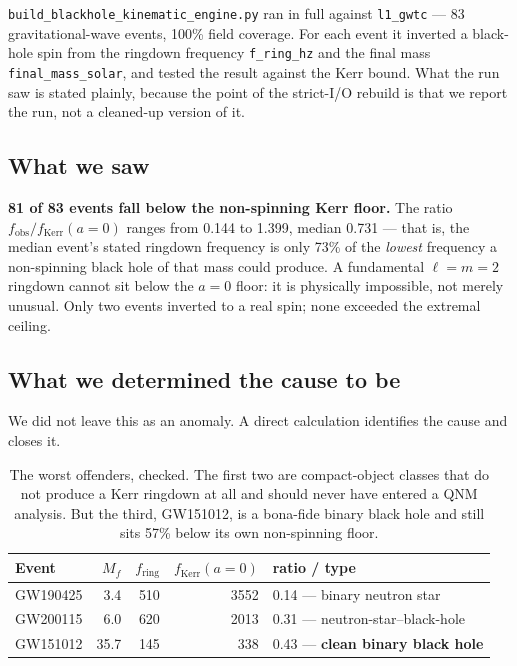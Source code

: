 \documentclass[11pt, letterpaper, openany]{book}
\begin{document}
\texttt{build\_blackhole\_kinematic\_engine.py} ran in full against \texttt{l1\_gwtc} --- 83
gravitational-wave events, 100\% field coverage. For each event it inverted a black-hole spin from
the ringdown frequency \texttt{f\_ring\_hz} and the final mass \texttt{final\_mass\_solar}, and
tested the result against the Kerr bound. What the run saw is stated plainly, because the point of
the strict-I/O rebuild is that we report the run, not a cleaned-up version of it.

\subsection{What we saw}

\begin{erratumbox}
\textbf{81 of 83 events fall below the non-spinning Kerr floor.} The ratio
$f_{\text{obs}}/f_{\text{Kerr}}(a{=}0)$ ranges from 0.144 to 1.399, median 0.731 --- that is, the
median event's stated ringdown frequency is only 73\% of the \emph{lowest} frequency a
non-spinning black hole of that mass could produce. A fundamental $\ell = m = 2$ ringdown cannot
sit below the $a=0$ floor: it is physically impossible, not merely unusual. Only two events
inverted to a real spin; none exceeded the extremal ceiling.
\end{erratumbox}

\subsection{What we determined the cause to be}

We did not leave this as an anomaly. A direct calculation identifies the cause and closes it.

\begin{table}[H]
\centering
\small
\begin{tabular}{@{}lrrrl@{}}
\toprule
\textbf{Event} & \textbf{$M_f$} & \textbf{$f_{\text{ring}}$} & \textbf{$f_{\text{Kerr}}(a{=}0)$} & \textbf{ratio / type} \\
\midrule
GW190425 & 3.4 & 510 & 3552 & 0.14 --- binary neutron star \\
GW200115 & 6.0 & 620 & 2013 & 0.31 --- neutron-star--black-hole \\
GW151012 & 35.7 & 145 & 338 & 0.43 --- \textbf{clean binary black hole} \\
\bottomrule
\end{tabular}
\caption{The worst offenders, checked. The first two are compact-object classes that do not
produce a Kerr ringdown at all and should never have entered a QNM analysis. But the third,
GW151012, is a bona-fide binary black hole and still sits 57\% below its own non-spinning floor.}
\end{table}
\end{document}
